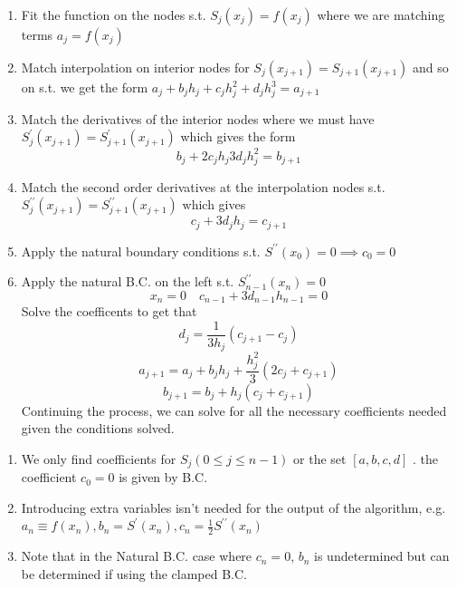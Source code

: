 \begin{enumerate}
    \item Fit the function on the nodes s.t. \(S_j(x_j) = f(x_j)\) where we are matching terms \(a_j = f(x_j)\) 
    \item Match interpolation on interior nodes for \(S_j (x_{j+1} ) = S_{j+1} (x_{j+1} ) \)  and so on s.t. we get 
    the form \(a_j + b_j h_j + c_j h_j ^{2}  + d_j h_j ^{3}  = a_{j+1} \) 
    \item Match the derivatives of the interior nodes where we must have 
    \(S_j^{\prime} (x_{j+1} ) = S_{j+1}^{\prime} (x_{j+1} ) \) which gives the form
    \[
        b_j + 2c_j h_j 3 d_j h_j ^{2}  = b_{j+1} 
    \]
    \item Match the second order derivatives at the interpolation nodes s.t. 
    \(S_j ^{\prime\prime}  (x_{j+1} ) = S_{j+1}^{\prime\prime} (x_{j+1} ) \) 
    which gives
    \[
        c_j + 3d_j h_j = c_{j+1} 
    \]
    \item Apply the natural boundary conditions s.t. \(S^{\prime\prime} (x_0) = 0 \implies  c_0 = 0\) 
    \item Apply the natural B.C. on the left s.t. \(S^{\prime\prime}_{n-1} (x_n) = 0 \)
    \[
        x_n = 0 \quad c_{n-1} + 3d_{n-1} h_{n-1} = 0 
    \] 
    Solve the coefficents to get that 
    \[
        d_j = \frac{1}{3h_j} \left( c_{j+1} - c_j \right) 
    \]
    \[
        a_{j+1} = a_j + b_j h_j + \frac{h_j ^{2} }{3}\left( 2c_j + c_{j+1}  \right) 
    \]
    \[
        b_{j+1} = b_j + h_j \left( c_j + c_{j+1}  \right) 
    \]
    Continuing the process, we can solve for all the necessary coefficients needed given the conditions solved. 
\end{enumerate}
\begin{remark}
    \begin{enumerate}
        \item We only find coefficients for \(S_j (0 \leq  j \leq  n-1)\) or the set 
        \( \left[ a,b,c,d \right] \) . the coefficient \(c_0 = 0\) is given by B.C. 
        \item Introducing extra variables isn't needed for the output of the algorithm, e.g. 
        \(a_n \equiv f(x_n), b_n = S^{\prime} (x_n), c_n = \frac{1}{2} S^{\prime\prime} (x_n)\) 
        \item Note that in the Natural B.C. case where \(c_n =0 \), \(b_n\) is undetermined but can be determined if 
        using the clamped B.C.
    \end{enumerate}
\end{remark}

